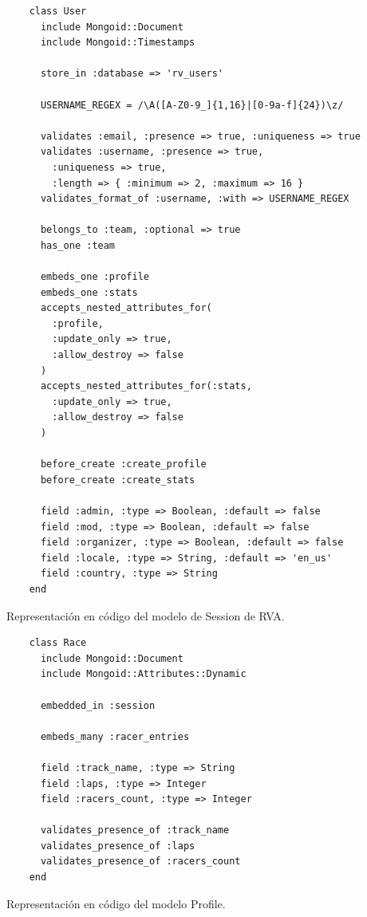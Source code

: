 \begin{listing}
  \begin{verbatim}
    class User
      include Mongoid::Document
      include Mongoid::Timestamps
      
      store_in :database => 'rv_users'
      
      USERNAME_REGEX = /\A([A-Z0-9_]{1,16}|[0-9a-f]{24})\z/
      
      validates :email, :presence => true, :uniqueness => true
      validates :username, :presence => true, 
        :uniqueness => true, 
        :length => { :minimum => 2, :maximum => 16 }
      validates_format_of :username, :with => USERNAME_REGEX
      
      belongs_to :team, :optional => true
      has_one :team
      
      embeds_one :profile
      embeds_one :stats
      accepts_nested_attributes_for(
        :profile,
        :update_only => true,
        :allow_destroy => false
      )
      accepts_nested_attributes_for(:stats,
        :update_only => true,
        :allow_destroy => false
      )
      
      before_create :create_profile
      before_create :create_stats
      
      field :admin, :type => Boolean, :default => false
      field :mod, :type => Boolean, :default => false
      field :organizer, :type => Boolean, :default => false
      field :locale, :type => String, :default => 'en_us'
      field :country, :type => String
    end
  \end{verbatim}
  \caption[Esquema de Session]{Representación en código del modelo de Session de RVA.}
\end{listing}

\begin{listing}
  \begin{verbatim}
    class Race
      include Mongoid::Document
      include Mongoid::Attributes::Dynamic
      
      embedded_in :session
      
      embeds_many :racer_entries
      
      field :track_name, :type => String
      field :laps, :type => Integer
      field :racers_count, :type => Integer
      
      validates_presence_of :track_name
      validates_presence_of :laps
      validates_presence_of :racers_count
    end
  \end{verbatim}
  \caption[Esquema de Profile]{Representación en código del modelo Profile.}
\end{listing}

